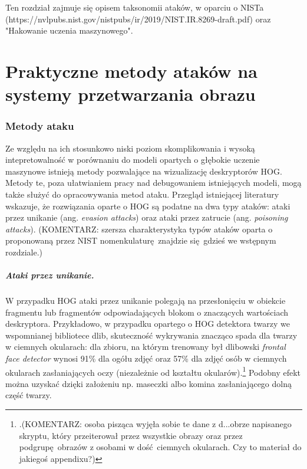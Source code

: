\documentclass[12pt,a4paper,leqno,oneside,titlepage]{book}
\begin{document}
Ten rozdział zajmuje się opisem taksonomii ataków, w oparciu o NISTa (https://nvlpubs.nist.gov/nistpubs/ir/2019/NIST.IR.8269-draft.pdf) oraz "Hakowanie uczenia maszynowego".

%
%
%
%
%
%
%
%
%
%

\chapter{Praktyczne metody ataków na systemy przetwarzania obrazu}


\subsection{Metody ataku}
Ze względu na ich stosunkowo niski poziom skomplikowania i wysoką intepretowalność w porównaniu do modeli opartych o głębokie uczenie maszynowe istnieją metody pozwalające na wizualizację deskryptorów HOG. Metody te, poza ułatwianiem pracy nad debugowaniem istniejących modeli, mogą także służyć do opracowywania metod ataku. Przegląd istniejącej literatury wskazuje, że rozwiązania oparte o HOG są podatne na dwa typy ataków: ataki przez unikanie (ang. \textit{evasion attacks}) oraz ataki przez zatrucie (ang. \textit{poisoning attacks})\cite{Hoggles, MacDonald19}. (KOMENTARZ: szersza charakterystyka typów ataków oparta o proponowaną przez NIST nomenkulaturę znajdzie się gdzieś we wstępnym rozdziale.)

\paragraph{Ataki przez unikanie.}
W przypadku HOG ataki przez unikanie polegają na przesłonięciu w obiekcie fragmentu lub fragmentów odpowiadających blokom o znaczących wartościach deskryptora. Przykładowo, w przypadku opartego o HOG detektora twarzy we wspomnianej bibliotece dlib, skuteczność wykrywania znacząco spada dla twarzy w ciemnych okularach: dla zbioru, na którym trenowany był dlibowski \textit{frontal face detector} wynosi 91\% dla ogółu zdjęć oraz 57\% dla zdjęć osób w ciemnych okularach zasłaniających oczy (niezależnie od kształtu okularów).\footnote{.(KOMENTARZ: osoba pisząca wyjęła sobie te dane z d...obrze napisanego skryptu, który przeiterował przez wszystkie obrazy oraz przez podgrupę obrazów z osobami w dość ciemnych okularach. Czy to materiał do jakiegoś appendixu?) } Podobny efekt można uzyskać dzięki założeniu np. maseczki albo komina zasłaniającego dolną część twarzy\cite{dlibPage, MacDonald19}.
\end{document}
